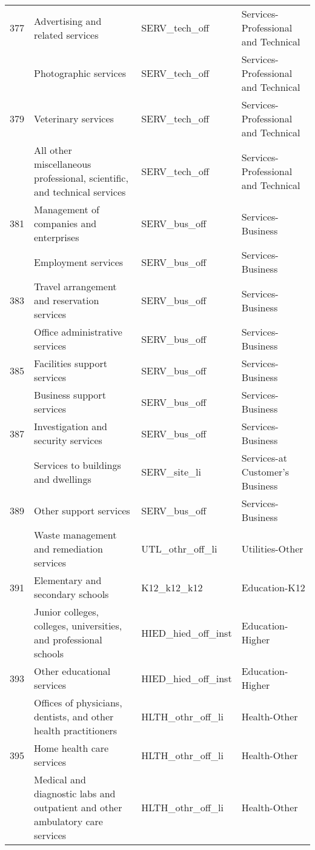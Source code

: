 \begin{landscape}
\begin{small}
\begin{longtable}{clll}
377 & Advertising and related services & SERV\_tech\_off & Services-Professional and Technical \\
\gray 378 & Photographic services & SERV\_tech\_off & Services-Professional and Technical \\
379 & Veterinary services & SERV\_tech\_off & Services-Professional and Technical \\
\gray 380 & All other miscellaneous professional, scientific, and technical services & SERV\_tech\_off & Services-Professional and Technical \\
381 & Management of companies and enterprises & SERV\_bus\_off & Services-Business \\
\gray 382 & Employment services & SERV\_bus\_off & Services-Business \\
383 & Travel arrangement and reservation services & SERV\_bus\_off & Services-Business \\
\gray 384 & Office administrative services & SERV\_bus\_off & Services-Business \\
385 & Facilities support services & SERV\_bus\_off & Services-Business \\
\gray 386 & Business support services & SERV\_bus\_off & Services-Business \\
387 & Investigation and security services & SERV\_bus\_off & Services-Business \\
\gray 388 & Services to buildings and dwellings & SERV\_site\_li & Services-at Customer's Business \\
389 & Other support services & SERV\_bus\_off & Services-Business \\
\gray 390 & Waste management and remediation services & UTL\_othr\_off\_li & Utilities-Other \\
391 & Elementary and secondary schools & K12\_k12\_k12 & Education-K12 \\
\gray 392 & Junior colleges, colleges, universities, and professional schools & HIED\_hied\_off\_inst & Education-Higher \\
393 & Other educational services & HIED\_hied\_off\_inst & Education-Higher \\
\gray 394 & Offices of physicians, dentists, and other health practitioners & HLTH\_othr\_off\_li & Health-Other \\
395 & Home health care services & HLTH\_othr\_off\_li & Health-Other \\
\gray 396 & Medical and diagnostic labs and outpatient and other ambulatory care services & HLTH\_othr\_off\_li & Health-Other \\

\end{longtable}
\end{small}
\end{landscape}
